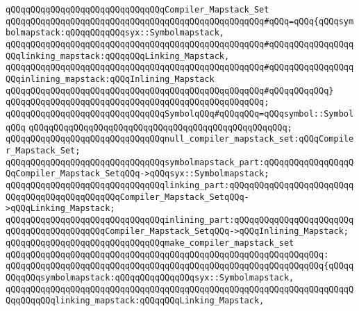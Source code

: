 \newline
\verb|qQQqqQQqqQQqqQQqqQQqqQQqqQQqqQQqCompiler_Mapstack_Set|\newline
\verb|qQQqqQQqqQQqqQQqqQQqqQQqqQQqqQQqqQQqqQQqqQQqqQQqqQQq#qQQq=qQQq{qQQqsymbolmapstack:qQQqqQQqqQQqsyx::Symbolmapstack,|\newline
\verb|qQQqqQQqqQQqqQQqqQQqqQQqqQQqqQQqqQQqqQQqqQQqqQQqqQQq#qQQqqQQqqQQqqQQqqQQqlinking_mapstack:qQQqqQQqLinking_Mapstack,|\newline
\verb|qQQqqQQqqQQqqQQqqQQqqQQqqQQqqQQqqQQqqQQqqQQqqQQqqQQq#qQQqqQQqqQQqqQQqqQQqinlining_mapstack:qQQqInlining_Mapstack|\newline
\verb|qQQqqQQqqQQqqQQqqQQqqQQqqQQqqQQqqQQqqQQqqQQqqQQqqQQq#qQQqqQQqqQQq}|\newline
\verb|qQQqqQQqqQQqqQQqqQQqqQQqqQQqqQQqqQQqqQQqqQQqqQQqqQQq;|\newline
\newline
\verb|qQQqqQQqqQQqqQQqqQQqqQQqqQQqqQQqSymbolqQQq#qQQqqQQq=qQQqsymbol::SymbolqQQq|\newline
\verb|qQQqqQQqqQQqqQQqqQQqqQQqqQQqqQQqqQQqqQQqqQQqqQQqqQQq;|\newline
\newline
\verb|qQQqqQQqqQQqqQQqqQQqqQQqqQQqqQQqnull_compiler_mapstack_set:qQQqCompiler_Mapstack_Set;|\newline
\newline
\verb|qQQqqQQqqQQqqQQqqQQqqQQqqQQqqQQqsymbolmapstack_part:qQQqqQQqqQQqqQQqqQQqCompiler_Mapstack_SetqQQq->qQQqsyx::Symbolmapstack;|\newline
\verb|qQQqqQQqqQQqqQQqqQQqqQQqqQQqqQQqlinking_part:qQQqqQQqqQQqqQQqqQQqqQQqqQQqqQQqqQQqqQQqqQQqqQQqCompiler_Mapstack_SetqQQq->qQQqLinking_Mapstack;|\newline
\verb|qQQqqQQqqQQqqQQqqQQqqQQqqQQqqQQqinlining_part:qQQqqQQqqQQqqQQqqQQqqQQqqQQqqQQqqQQqqQQqqQQqCompiler_Mapstack_SetqQQq->qQQqInlining_Mapstack;|\newline
\newline
\verb|qQQqqQQqqQQqqQQqqQQqqQQqqQQqqQQqmake_compiler_mapstack_set|\newline
\verb|qQQqqQQqqQQqqQQqqQQqqQQqqQQqqQQqqQQqqQQqqQQqqQQqqQQqqQQqqQQqqQQq:|\newline
\verb|qQQqqQQqqQQqqQQqqQQqqQQqqQQqqQQqqQQqqQQqqQQqqQQqqQQqqQQqqQQqqQQq{qQQqqQQqqQQqsymbolmapstack:qQQqqQQqqQQqqQQqsyx::Symbolmapstack,|\newline
\verb|qQQqqQQqqQQqqQQqqQQqqQQqqQQqqQQqqQQqqQQqqQQqqQQqqQQqqQQqqQQqqQQqqQQqqQQqqQQqqQQqlinking_mapstack:qQQqqQQqLinking_Mapstack,|\newline
